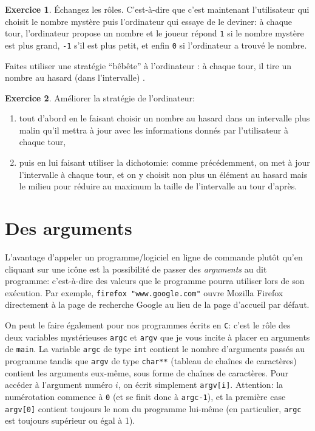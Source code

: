 \documentclass[french,a4paper]{article}
\theoremstyle{definition}
\newtheorem{exercise}{Exercice}
\theoremstyle{remark}
\newcommand{\shell}[1]{\lstinline[style=sh]|#1|}
\newcommand{\inlinec}[1]{\lstinline[style=C]°#1°}
\begin{document}
\begin{exercise}
  \'Echangez les rôles. C'est-à-dire que c'est maintenant
  l'utilisateur qui choisit le nombre mystère puis l'ordinateur qui
  essaye de le deviner: à chaque tour, l'ordinateur propose un nombre
  et le joueur répond \inlinec{1} si le nombre mystère est plus grand,
  \inlinec{-1} s'il est plus petit, et enfin \inlinec{0} si
  l'ordinateur a trouvé le nombre.

  Faites utiliser une stratégie ``bêbête'' à l'ordinateur : à chaque
  tour, il tire un nombre au hasard (dans l'intervalle) .
\end{exercise}

\begin{exercise}
  Améliorer la stratégie de l'ordinateur:
  \begin{enumerate}[label=(\arabic*)]
  \item tout d'abord en le faisant choisir un nombre au hasard dans un
    intervalle plus malin qu'il mettra à jour avec les informations
    donnés par l'utilisateur à chaque tour,
  \item puis en lui faisant utiliser la dichotomie: comme
    précédemment, on met à jour l'intervalle à chaque tour, et on y
    choisit non plus un élément au hasard mais le milieu pour réduire
    au maximum la taille de l'intervalle au tour d'après.
  \end{enumerate}
\end{exercise}

\section{Des arguments}
\label{sec:args}

L'avantage d'appeler un programme/logiciel en ligne de commande plutôt
qu'en cliquant sur une icône est la possibilité de passer des {\em
  arguments} au dit programme: c'est-à-dire des valeurs que le
programme pourra utiliser lors de son exécution. Par exemple,
\shell{firefox "www.google.com"} ouvre Mozilla Firefox directement à
la page de recherche Google au lieu de la page d'accueil par défaut.

On peut le faire également pour nos programmes écrits en {\tt C}:
c'est le rôle des deux variables mystérieuses \inlinec{argc} et
\inlinec{argv} que je vous incite à placer en arguments de
\inlinec{main}. La variable \inlinec{argc} de type \inlinec{int}
contient le nombre d'arguments passés au programme tandis que
\inlinec{argv} de type \inlinec{char**} (tableau de chaînes de
caractères) contient les arguments eux-même, sous forme de chaînes de
caractères. Pour accéder à l'argument numéro $i$, on écrit simplement
\inlinec{argv[i]}. Attention: la numérotation commence à \inlinec{0}
(et se finit donc à \inlinec{argc-1}), et la première case
\inlinec{argv[0]} contient toujours le nom du programme lui-même (en
particulier, \inlinec{argc} est toujours supérieur ou égal à 1).
\end{document}
